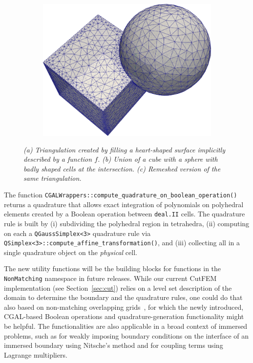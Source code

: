 \documentclass{ansarticle-preprint}
\newcommand{\specialword}[1]{\texttt{#1}}
\newcommand{\dealii}{{\specialword{deal.II}}\xspace}
\begin{document}
\begin{figure}
\begin{subfigure}[b]{0.28\textwidth}
    \caption{\label{fig:corefinement}}
  \end{subfigure}
  \hfill
  \begin{subfigure}[b]{0.35\textwidth}
    \centering
    \includegraphics[width=\textwidth]{png/cube_sphere_remeshed.png}
    \caption{ \label{fig:corefinement_remeshed}}
  \end{subfigure}
  \caption{\it (a) Triangulation created by filling a heart-shaped surface implicitly described by a function $f$. (b) Union of a cube with a sphere with badly shaped cells at the intersection. (c) Remeshed version of the same triangulation.}
\end{figure}

The function
\texttt{CGALWrappers::compute\_quadrature\_on\_boolean\_operation()}
returns a quadrature that allows exact integration of polynomials on
polyhedral elements created by a Boolean operation between \dealii cells.
The quadrature rule is built by (i) subdividing the polyhedral region in tetrahedra, (ii) computing on each a \texttt{QGaussSimplex<3>} quadrature rule via \texttt{QSimplex<3>::\allowbreak{}compute\_affine\_transformation()}, and (iii)
collecting all in a single quadrature object on the \emph{physical} cell.

The new utility functions will be the building blocks for functions in 
the \texttt{NonMatching} namespace in future releases. While our current 
CutFEM implementation (see Section~\ref{sec:cut}) relies on a level set description of the domain to determine
the boundary and the quadrature rules, one could do that also based on non-matching overlapping
grids~\cite{massing2013efficient}, for which the newly introduced, CGAL-based Boolean operations and 
quadrature-generation functionality might be helpful.
The functionalities are also applicable in a broad context of immersed problems, such as
for weakly imposing boundary conditions on the interface of an immersed boundary
using Nitsche's method and for coupling terms using Lagrange multipliers.
\end{document}
